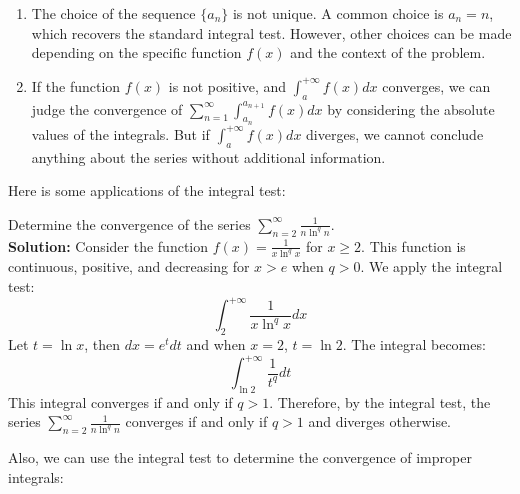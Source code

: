 \begin{remark}
    \begin{enumerate}
        \item The choice of the sequence $\{a_n\}$ is not unique. A common choice is $a_n = n$, which recovers the standard integral test. However, other choices can be made depending on the specific function $f(x)$ and the context of the problem.
        \item If the function $f(x)$ is not positive, and $\int_a^{+\infty} f(x) dx$ converges, we can judge the convergence of $\sum_{n=1}^{\infty} \int_{a_n}^{a_{n+1}} f(x) dx$ by considering the absolute values of the integrals. But if $\int_a^{+\infty} f(x) dx$ diverges, we cannot conclude anything about the series without additional information.
    \end{enumerate}
\end{remark}

Here is some applications of the integral test:

\newpage

\begin{example}
    Determine the convergence of the series $\sum_{n=2}^{\infty} \frac{1}{n \ln^q n}$. \\
    \textbf{Solution:} Consider the function $f(x) = \frac{1}{x \ln^q x}$ for $x \ge 2$. This function is continuous, positive, and decreasing for $x > e$ when $q > 0$. We apply the integral test:
    \[\int_2^{+\infty} \frac{1}{x \ln^q x} dx \]
    Let $t = \ln x$, then $dx = e^t dt$ and when $x = 2$, $t = \ln 2$. The integral becomes:
    \[\int_{\ln 2}^{+\infty} \frac{1}{t^q} dt \]
    This integral converges if and only if $q > 1$. Therefore, by the integral test, the series $\sum_{n=2}^{\infty} \frac{1}{n \ln^q n}$ converges if and only if $q > 1$ and diverges otherwise.
\end{example}

Also, we can use the integral test to determine the convergence of improper integrals:


